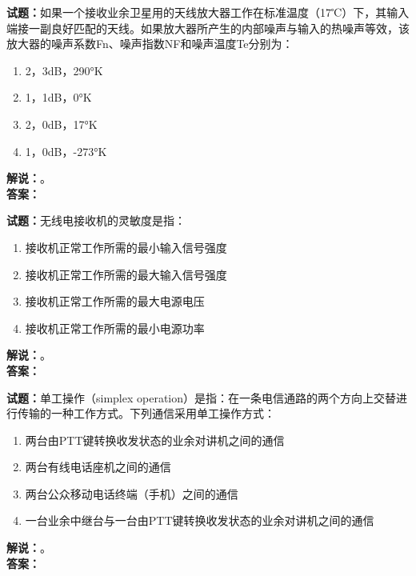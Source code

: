 \documentclass{ctexbook}
\begin{document}
\vspace{\baselineskip}

\noindent\textbf{试题：}如果一个接收业余卫星用的天线放大器工作在标准温度（17℃）下，其输入端接一副良好匹配的天线。如果放大器所产生的内部噪声与输入的热噪声等效，该放大器的噪声系数Fn、噪声指数NF和噪声温度Te分别为：
\begin{enumerate}[leftmargin=3em]
  \item 2，3dB，290°K
  \item 1，1dB，0°K
  \item 2，0dB，17°K
  \item 1，0dB，-273°K
\end{enumerate}
\noindent\textbf{解说：}\textbf{}。\\\noindent\textbf{答案：}

\vspace{\baselineskip}

\noindent\textbf{试题：}无线电接收机的灵敏度是指：
\begin{enumerate}[leftmargin=3em]
  \item 接收机正常工作所需的最小输入信号强度
  \item 接收机正常工作所需的最大输入信号强度
  \item 接收机正常工作所需的最大电源电压
  \item 接收机正常工作所需的最小电源功率
\end{enumerate}
\noindent\textbf{解说：}\textbf{}。\\\noindent\textbf{答案：}

\vspace{\baselineskip}

\noindent\textbf{试题：}单工操作（simplex operation）是指：在一条电信通路的两个方向上交替进行传输的一种工作方式。下列通信采用单工操作方式：
\begin{enumerate}[leftmargin=3em]
  \item 两台由PTT键转换收发状态的业余对讲机之间的通信
  \item 两台有线电话座机之间的通信
  \item 两台公众移动电话终端（手机）之间的通信
  \item 一台业余中继台与一台由PTT键转换收发状态的业余对讲机之间的通信
\end{enumerate}
\noindent\textbf{解说：}\textbf{}。\\\noindent\textbf{答案：}

\vspace{\baselineskip}
\end{document}
